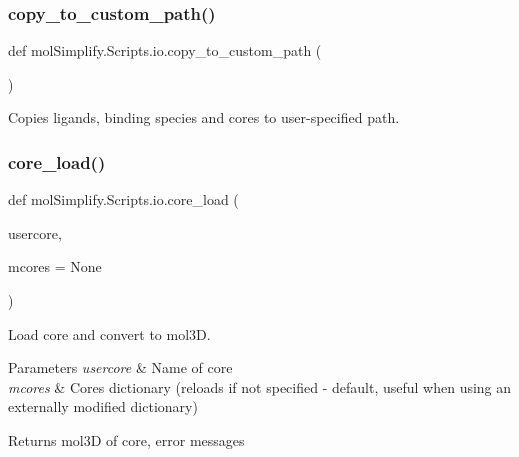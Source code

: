 \subsubsection{\texorpdfstring{copy\+\_\+to\+\_\+custom\+\_\+path()}{copy\_to\_custom\_path()}}
{\footnotesize\ttfamily def mol\+Simplify.\+Scripts.\+io.\+copy\+\_\+to\+\_\+custom\+\_\+path (\begin{DoxyParamCaption}{ }\end{DoxyParamCaption})}



Copies ligands, binding species and cores to user-\/specified path. 

\mbox{\label{namespacemolSimplify_1_1Scripts_1_1io_a0eec4377fe71927746ad97bbdc8d2d34}} 
\subsubsection{\texorpdfstring{core\+\_\+load()}{core\_load()}}
{\footnotesize\ttfamily def mol\+Simplify.\+Scripts.\+io.\+core\+\_\+load (\begin{DoxyParamCaption}\item[{}]{usercore,  }\item[{}]{mcores = {\ttfamily None} }\end{DoxyParamCaption})}



Load core and convert to mol3D. 


\begin{DoxyParams}{Parameters}
{\em usercore} & Name of core \\
\hline
{\em mcores} & Cores dictionary (reloads if not specified -\/ default, useful when using an externally modified dictionary) \\
\hline
\end{DoxyParams}
\begin{DoxyReturn}{Returns}
mol3D of core, error messages 
\end{DoxyReturn}
\mbox{\label{namespacemolSimplify_1_1Scripts_1_1io_aaa2e5af12673a509d53b353f7aa79d2c}} 

